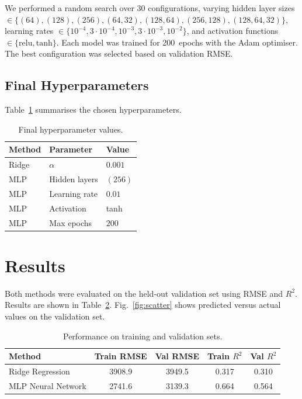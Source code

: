 \documentclass[a4, 10pt, conference]{ieeeconf}
\begin{document}
We performed a random search over 30 configurations, varying hidden layer sizes $\in \{(64), (128), (256), (64,32), (128,64), (256,128), (128,64,32)\}$, learning rates $\in \{10^{-4}, 3{\cdot}10^{-4}, 10^{-3}, 3{\cdot}10^{-3}, 10^{-2}\}$, and activation functions $\in \{\text{relu}, \text{tanh}\}$. Each model was trained for 200~epochs with the Adam optimiser. The best configuration was selected based on validation RMSE.

\subsection{Final Hyperparameters}
Table~\ref{tab:hyperparams} summarises the chosen hyperparameters.

\begin{table}[h]
\centering
\caption{Final hyperparameter values.}
\label{tab:hyperparams}
\begin{tabular}{lll}
\toprule
Method & Parameter & Value \\
\midrule
Ridge  & $\alpha$       & $0.001$ \\
MLP    & Hidden layers  & $(256)$ \\
MLP    & Learning rate  & $0.01$ \\
MLP    & Activation     & tanh \\
MLP    & Max epochs     & $200$ \\
\bottomrule
\end{tabular}
\end{table}

\section{Results}
\label{sec:results}

Both methods were evaluated on the held-out validation set using RMSE and $R^2$. Results are shown in Table~\ref{tab:results}. Fig.~\ref{fig:scatter} shows predicted versus actual values on the validation set.

\begin{table}[h]
\centering
\caption{Performance on training and validation sets.}
\label{tab:results}
\begin{tabular}{lcccc}
\toprule
Method & Train RMSE & Val RMSE & Train $R^2$ & Val $R^2$ \\
\midrule
Ridge Regression   & 3908.9 & 3949.5 & 0.317 & 0.310 \\
MLP Neural Network & 2741.6 & 3139.3 & 0.664 & 0.564 \\
\bottomrule
\end{tabular}
\end{table}
\end{document}
